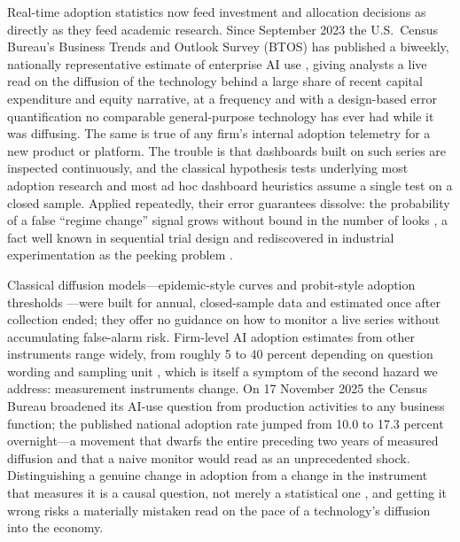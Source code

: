 \documentclass[preprint,12pt]{elsarticle}
\begin{document}
Real-time adoption statistics now feed investment and allocation decisions as directly as they feed academic research. Since September 2023 the U.S.\ Census Bureau's Business Trends and Outlook Survey (BTOS) has published a biweekly, nationally representative estimate of enterprise AI use \citep{bonney2024}, giving analysts a live read on the diffusion of the technology behind a large share of recent capital expenditure and equity narrative, at a frequency and with a design-based error quantification no comparable general-purpose technology has ever had while it was diffusing. The same is true of any firm's internal adoption telemetry for a new product or platform. The trouble is that dashboards built on such series are inspected continuously, and the classical hypothesis tests underlying most adoption research and most ad hoc dashboard heuristics assume a single test on a closed sample. Applied repeatedly, their error guarantees dissolve: the probability of a false ``regime change'' signal grows without bound in the number of looks \citep{armitage1969}, a fact well known in sequential trial design and rediscovered in industrial experimentation as the peeking problem \citep{johari2022}.

Classical diffusion models---epidemic-style curves \citep{bass1969} and probit-style adoption thresholds \citep{geroski2000}---were built for annual, closed-sample data and estimated once after collection ended; they offer no guidance on how to monitor a live series without accumulating false-alarm risk. Firm-level AI adoption estimates from other instruments range widely, from roughly 5 to 40 percent depending on question wording and sampling unit \citep{crane2025}, which is itself a symptom of the second hazard we address: measurement instruments change. On 17 November 2025 the Census Bureau broadened its AI-use question from production activities to any business function; the published national adoption rate jumped from 10.0 to 17.3 percent overnight---a movement that dwarfs the entire preceding two years of measured diffusion and that a naive monitor would read as an unprecedented shock. Distinguishing a genuine change in adoption from a change in the instrument that measures it is a causal question, not merely a statistical one \citep{pearl2009}, and getting it wrong risks a materially mistaken read on the pace of a technology's diffusion into the economy.
\end{document}
